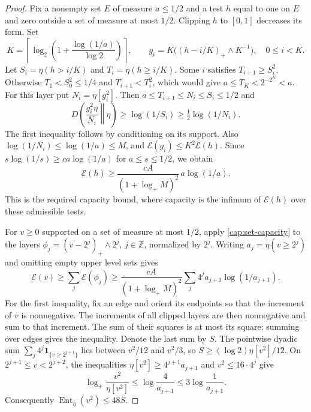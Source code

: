 \begin{proof}
Fix a nonempty set $E$ of measure $a\le1/2$ and a test $h$ equal to one
on $E$ and zero outside a set of measure at most $1/2$.  Clipping $h$ to
$[0,1]$ decreases its form.  Set
\[
 K=\left\lceil\log_2\!\left(1+
                  \frac{\log(1/a)}{\log2}\right)\right\rceil,
 \qquad
 g_i=K\big((h-i/K)_+\wedge K^{-1}\big),\quad 0\le i<K.
\]
Let $S_i=\eta(h>i/K)$ and $T_i=\eta(h\ge i/K)$. Some $i$ satisfies $T_{i+1}\ge
S_i^2$. Otherwise $T_1<S_0^2\le1/4$ and $T_{i+1}<T_i^2$, which would give
$a\le T_K<2^{-2^K}<a$. For this layer put $N_i=\eta[g_i^2]$. Then $a\le
T_{i+1}\le N_i\le S_i\le1/2$ and
\[
 D\!\left(\frac{g_i^2\eta}{N_i}\middle\Vert\eta\right)
 \ge\log(1/S_i)\ge\tfrac12\log(1/N_i).
\]
The first inequality follows by conditioning on its support. Also
$\log(1/N_i)\le\log(1/a)\le M$, and $\mathcal E(g_i)\le K^2\mathcal E(h)$.
Since $s\log(1/s)\ge c a\log(1/a)$ for $a\le s\le1/2$, we obtain
\begin{equation}\label{cap:set-capacity}
 \mathcal E(h)\ge
 \frac{cA}{(1+\log_+M)^2}\,a\log(1/a).
\end{equation}
This is the required capacity bound, where capacity is the infimum of
$\mathcal E(h)$ over these admissible tests.

For $v\ge0$ supported on a set of measure at most $1/2$, apply
\eqref{cap:set-capacity} to the layers $\phi_j=(v-2^j)_+\wedge2^j$,
$j\in\mathbb Z$, normalized by $2^j$. Writing $a_j=\eta(v\ge2^j)$ and omitting
empty upper level sets gives
\[
 \mathcal E(v)\ge\sum_j\mathcal E(\phi_j)
 \ge\frac{cA}{(1+\log_+M)^2}
       \sum_j4^j a_{j+1}\log(1/a_{j+1}).
\]
For the first inequality, fix an edge and orient its endpoints so that the
increment of $v$ is nonnegative. The increments of all clipped layers are then
nonnegative and sum to that increment. The sum of their squares is at most its
square; summing over edges gives the inequality. Denote the last sum by $S$.
The pointwise dyadic sum $\sum_j4^j\mathbf1_{\{v\ge2^{j+1}\}}$ lies between
$v^2/12$ and $v^2/3$, so $S\ge(\log2)\eta[v^2]/12$. On $2^{j+1}\le v<2^{j+2}$,
the inequalities $\eta[v^2]\ge4^{j+1}a_{j+1}$ and $v^2\le16\cdot4^j$ give
\[
 \log_+\frac{v^2}{\eta[v^2]}
 \le\log\frac4{a_{j+1}}\le3\log\frac1{a_{j+1}}.
\]
Consequently $\operatorname{Ent}_{\eta}(v^2)\le48S$.


\end{proof}

